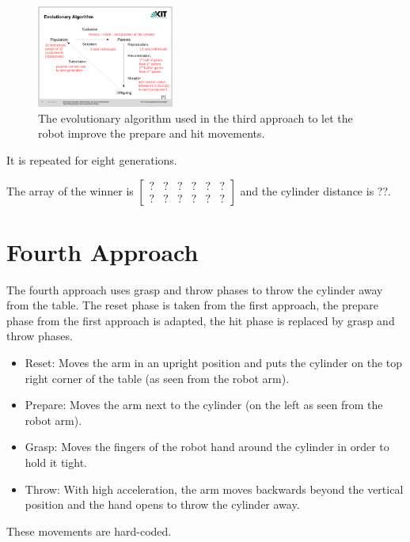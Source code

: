 \documentclass[10pt,twocolumn,letterpaper]{article}
\begin{document}
\begin{figure}
	\begin{center}
		\includegraphics[trim = 1cm 2.3cm 0.5cm 4cm, clip, width=0.4\textwidth]{Presentation1-seiten-7}
	\end{center}
	\caption{The evolutionary algorithm used in the third approach to let the robot improve the prepare and hit movements.}
	\label{fig:EA_3}
\end{figure}

It is repeated for eight generations. 

The array of the winner is 
				$\begin{bmatrix}
				? & ? & ? & ? & ? & ? \\ ? & ? & ? & ? & ? & ?
				\end{bmatrix}$
and the cylinder distance is ??.

\section{Fourth Approach} \label{sec:fourthApproach}

The fourth approach uses grasp and throw phases to throw the cylinder away from the table. The reset phase is taken from the first approach, the prepare phase from the first approach is adapted, the hit phase is replaced by grasp and throw phases.
\begin{itemize}
\item Reset: Moves the arm in an upright position and puts the cylinder on the top right corner of the table (as seen from the robot arm).
\item Prepare: Moves the arm next to the cylinder (on the left as seen from the robot arm).
\item Grasp: Moves the fingers of the robot hand around the cylinder in order to hold it tight.
\item Throw: With high acceleration, the arm moves backwards beyond the vertical position and the hand opens to throw the cylinder away.
\end{itemize}

These movements are hard-coded.
\end{document}
